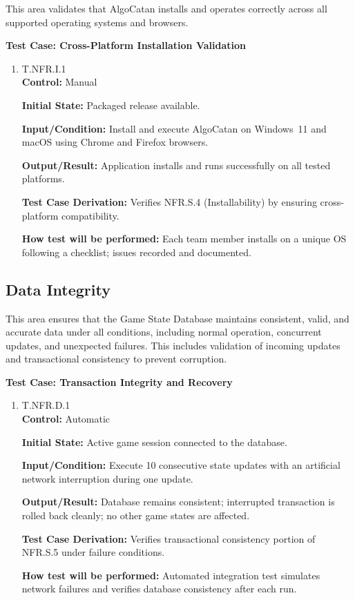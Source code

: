 \documentclass[12pt, titlepage]{article}
\begin{document}
This area validates that AlgoCatan installs and operates correctly across all supported operating systems and browsers.

\textbf{Test Case: Cross-Platform Installation Validation}

\begin{enumerate}
\item{\hypertarget{T.NFR.I.1}{T.NFR.I.1}\\}
\textbf{Control:} Manual

\textbf{Initial State:} Packaged release available.

\textbf{Input/Condition:} Install and execute AlgoCatan on Windows~11 and macOS using Chrome and Firefox browsers.

\textbf{Output/Result:} Application installs and runs successfully on all tested platforms.

\textbf{Test Case Derivation:} Verifies NFR.S.4 (Installability) by ensuring cross-platform compatibility.

\textbf{How test will be performed:} Each team member installs on a unique OS following a checklist; issues recorded and documented.
\end{enumerate}

\subsection{Data Integrity}

This area ensures that the Game State Database maintains consistent, valid, and accurate data under all conditions, including normal operation, concurrent updates, and unexpected failures. This includes validation of incoming updates and transactional consistency to prevent corruption.

\textbf{Test Case: Transaction Integrity and Recovery}

\begin{enumerate}
\item{\hypertarget{T.NFR.D.1}{T.NFR.D.1}\\}
\textbf{Control:} Automatic

\textbf{Initial State:} Active game session connected to the database.

\textbf{Input/Condition:} Execute 10 consecutive state updates with an artificial network interruption during one update.

\textbf{Output/Result:} Database remains consistent; interrupted transaction is rolled back cleanly; no other game states are affected.

\textbf{Test Case Derivation:} Verifies transactional consistency portion of NFR.S.5 under failure conditions.

\textbf{How test will be performed:} Automated integration test simulates network failures and verifies database consistency after each run.
\end{enumerate}
\end{document}
